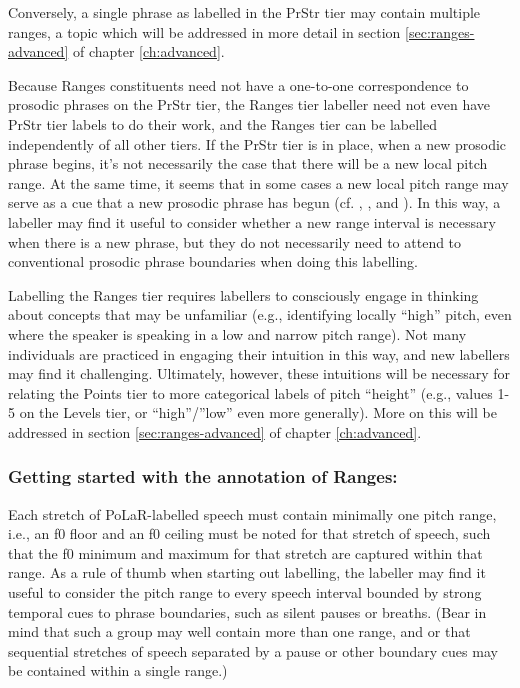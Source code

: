 \documentclass[11pt, twoside]{memoir}
\begin{document}
Conversely, a single phrase as labelled in the PrStr tier may contain multiple ranges, a topic which will be addressed in more detail in section \ref{sec:ranges-advanced} of chapter \ref{ch:advanced}.

Because Ranges constituents need not have a one-to-one correspondence to prosodic phrases on the PrStr tier, the Ranges tier labeller need not even have PrStr tier labels to do their work, and the Ranges tier can be labelled independently of all other tiers. If the PrStr tier is in place, when a new prosodic phrase begins, it’s not necessarily the case that there will be a new local pitch range. At the same time, it seems that in some cases a new local pitch range may serve as a cue that a new prosodic phrase has begun (cf. \citealt{brugos15}, \citealt{brugos-18}, and \citealt{kim20}). In this way, a labeller may find it useful to consider whether a new range interval is necessary when there is a new phrase, but they do not necessarily need to attend to conventional prosodic phrase boundaries when doing this labelling.

Labelling the Ranges tier requires labellers to consciously engage in thinking about concepts that may be unfamiliar (e.g., identifying locally “high” pitch, even where the speaker is speaking in a low and narrow pitch range). Not many individuals are practiced in engaging their intuition in this way, and new labellers may find it challenging. Ultimately, however, these intuitions will be necessary for relating the Points tier to more categorical labels of pitch “height” (e.g., values 1-5 on the Levels tier, or “high”\slash ”low” even more generally). More on this will be addressed in section \ref{sec:ranges-advanced} of chapter \ref{ch:advanced}.

\subsubsection{Getting started with the annotation of Ranges:}\label{sec:getting-started-with-the-annotation-of-ranges}

Each stretch of PoLaR-labelled speech must contain minimally one pitch range, i.e., an f0 floor and an f0 ceiling must be noted for that stretch of speech, such that the f0 minimum and maximum for that stretch are captured within that range. As a rule of thumb when starting out labelling, the labeller may find it useful to consider the pitch range to every speech interval bounded by strong temporal cues to phrase boundaries, such as silent pauses or breaths. (Bear in mind that such a group may well contain more than one range, and or that sequential stretches of speech separated by a pause or other boundary cues may be contained within a single range.)
\end{document}
